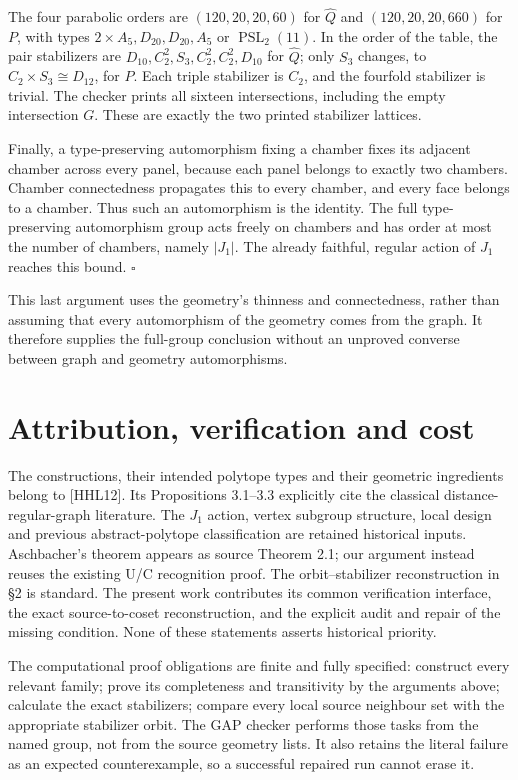 The four parabolic orders are \((120,20,20,60)\) for \(\widehat Q\) and
\((120,20,20,660)\) for \(P\), with types
\(2\times A_5,D_{20},D_{20},A_5\) or \(\operatorname{PSL}_2(11)\). In
the order of the table, the pair stabilizers are
\(D_{10},C_2^2,S_3,C_2^2,C_2^2,D_{10}\) for \(\widehat Q\); only \(S_3\)
changes, to \(C_2\times S_3\cong D_{12}\), for \(P\). Each triple
stabilizer is \(C_2\), and the fourfold stabilizer is trivial. The
checker prints all sixteen intersections, including the empty
intersection \(G\). These are exactly the two printed stabilizer
lattices.

Finally, a type-preserving automorphism fixing a chamber fixes its
adjacent chamber across every panel, because each panel belongs to
exactly two chambers. Chamber connectedness propagates this to every
chamber, and every face belongs to a chamber. Thus such an automorphism
is the identity. The full type-preserving automorphism group acts freely
on chambers and has order at most the number of chambers, namely
\(|J_1|\). The already faithful, regular action of \(J_1\) reaches this
bound. \(\square\)

This last argument uses the geometry's thinness and connectedness,
rather than assuming that every automorphism of the geometry comes from
the graph. It therefore supplies the full-group conclusion without an
unproved converse between graph and geometry automorphisms.

\section{Attribution, verification and
cost}\label{attribution-verification-and-cost}

The constructions, their intended polytope types and their geometric
ingredients belong to {[}HHL12{]}. Its Propositions 3.1--3.3 explicitly
cite the classical distance-regular-graph literature. The \(J_1\)
action, vertex subgroup structure, local design and previous
abstract-polytope classification are retained historical inputs.
Aschbacher's theorem appears as source Theorem 2.1; our argument instead
reuses the existing U/C recognition proof. The orbit--stabilizer
reconstruction in §2 is standard. The present work contributes its
common verification interface, the exact source-to-coset reconstruction,
and the explicit audit and repair of the missing condition. None of
these statements asserts historical priority.

The computational proof obligations are finite and fully specified:
construct every relevant family; prove its completeness and transitivity
by the arguments above; calculate the exact stabilizers; compare every
local source neighbour set with the appropriate stabilizer orbit. The
GAP checker performs those tasks from the named group, not from the
source geometry lists. It also retains the literal failure as an
expected counterexample, so a successful repaired run cannot erase it.

